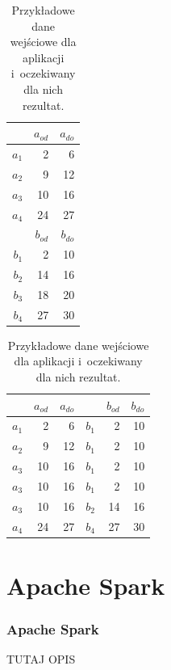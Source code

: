 \documentclass[aspectratio=169]{beamer}
\begin{document}
	\begin{frame} 
		\begin{table}
			\begin{minipage}{.45\textwidth} \centering
				\begin{tabular}{r|rr}
				      & $a_{od}$ & $a_{do}$ \\ \hline
				$a_1$ &        2 &        6 \\
				$a_2$ &        9 &       12 \\
				$a_3$ &       10 &       16 \\
				$a_4$ &       24 &       27 \\ \hline \hline
				      & $b_{od}$ & $b_{do}$ \\ \hline
				$b_1$ &        2 &       10 \\
				$b_2$ &       14 &       16 \\
				$b_3$ &       18 &       20 \\
				$b_4$ &       27 &       30 
				\end{tabular}	
			\end{minipage}%
			\hspace{0.05\textwidth}
			\begin{minipage}{.45\textwidth} \centering
				\begin{tabular}{r|rr||r|rr}
				      & $a_{od}$ & $a_{do}$ &       & $b_{od}$ & $b_{do}$ \\ \hline
				$a_1$ &        2 &        6 & $b_1$ &        2 &       10 \\
				$a_2$ &        9 &       12 & $b_1$ &        2 &       10 \\
				$a_3$ &       10 &       16 & $b_1$ &        2 &       10 \\
				$a_3$ &       10 &       16 & $b_1$ &        2 &       10 \\
				$a_3$ &       10 &       16 & $b_2$ &       14 &       16 \\
				$a_4$ &       24 &       27 & $b_4$ &       27 &       30 			
				\end{tabular}
			\end{minipage}	
			\caption{Przykładowe dane wejściowe dla aplikacji i~oczekiwany dla nich rezultat.}
		\end{table}	
	\end{frame}


\section{Apache Spark}
	\begin{frame}
		\frametitle{Apache Spark}
		TUTAJ OPIS
	\end{frame}
\end{document}
